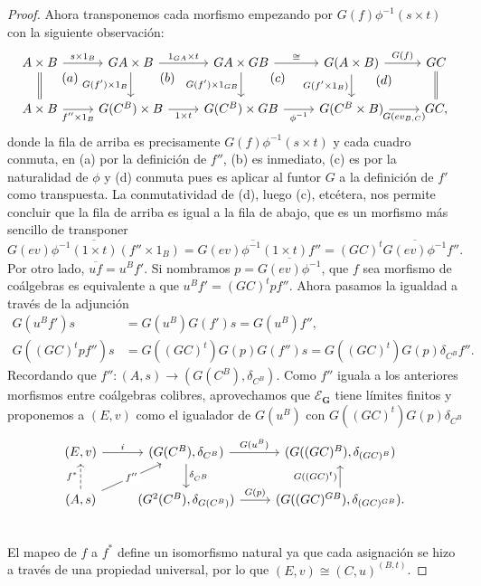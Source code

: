 \begin{proof}
  Ahora transponemos cada morfismo empezando por $G(f)\phi^{-1}(s\times t)$ con la siguiente observación:
  \begin{equation*}
    \begin{tikzcd}
      A\times B\ar[equals]{d}\ar{r}{s\times 1_B}\ar[near start,phantom]{rd}{(a)} & GA\times B\ar[swap]{d}{G(f')\times 1_B}\ar{r}{1_{GA}\times t}\ar[near start,phantom]{rd}{(b)} & GA\times GB\ar[swap]{d}{G(f')\times 1_{GB}}\ar{r}{\cong}\ar[near start,phantom]{rd}{(c)} & G(A\times B)\ar[swap]{d}{G(f'\times 1_B)}\ar{r}{G(f)}\ar[near start,phantom]{rd}{(d)} & GC\ar[equals]{d}\\
      A\times B\ar[swap]{r}{f''\times 1_B}              & G(C^B)\times B\ar[swap]{r}{1\times t}                       & G(C^B)\times GB\ar[swap]{r}{\phi^{-1}}                 & G(C^B\times B)\ar[swap]{r}{G(ev_{B,C})}             & GC,
    \end{tikzcd}
  \end{equation*}
  donde la fila de arriba es precisamente $G(f)\phi^{-1}(s\times t)$ y cada cuadro conmuta, en (a) por la definición de $f''$, (b) es inmediato, (c) es por la 
  naturalidad de $\phi$ y (d) conmuta pues es aplicar al funtor $G$ a la definición de $f'$ como 
  transpuesta. La conmutatividad de (d), luego (c), etcétera, nos permite concluir que la fila de
  arriba es igual a la fila de abajo, que es un morfismo más sencillo de transponer
  \begin{equation*}
    \overline{G(ev)\phi^{-1}(1\times t)(f''\times 1_B)} = \overline{G(ev)\phi^{-1}(1\times t)}f'' = (GC)^t\overline{G(ev)\phi^{-1}}f''.
  \end{equation*}
  Por otro lado, $\overline{uf} = u^Bf'$. Si nombramos $p=\overline{G(ev)\phi^{-1}}$, que $f$ sea
  morfismo de coálgebras es equivalente a que $u^Bf' = (GC)^tpf''$. Ahora pasamos la igualdad a
  través de la adjunción
  \begin{align*}
    G(u^Bf')s &= G(u^B)G(f')s = G(u^B)f'', \\
    G((GC)^tpf'')s &= G((GC)^t)G(p)G(f'')s = G((GC)^t)G(p)\delta_{C^B}f''.
  \end{align*}
  Recordando que $f''\colon (A,s)\to (G(C^B),\delta_{C^B})$. Como $f''$ iguala a los anteriores
  morfismos entre coálgebras colibres, aprovechamos que $\mathcal{E}_\textbf{G}$ tiene límites finitos
  y proponemos a $(E,v)$ como el igualador de $G(u^B)$ con $G((GC)^t)G(p)\delta_{C^B}$
  \begin{equation*}
    \begin{tikzcd}
      (E,v)\ar{r}{i} & (G(C^B),\delta_{C^B})\ar{r}{G(u^B)}\ar{d}{\delta_{C^B}} & (G((GC)^B),\delta_{(GC)^B}) \\
      (A,s)\ar[dashed]{u}{f^*}\ar{ru}[description]{f''} & (G^2(C^B),\delta_{G(C^B)})\ar{r}{G(p)} & (G((GC)^{GB}),\delta_{(GC)^{GB}}).\ar{u}{G((GC)^t)} \\
    \end{tikzcd}
  \end{equation*}
  El mapeo de $f$ a $f^*$ define un isomorfismo natural ya que cada asignación se hizo a través
  de una propiedad universal, por lo que $(E,v)\cong (C,u)^{(B,t)}$.
\end{proof}
